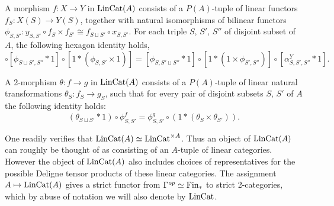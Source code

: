 \documentclass{amsart}
\begin{document}
A morphism $f:X \to Y$ in $\mathrm{LinCat}(A)$ consists of a $P(A)$-tuple of linear functors $f_S: X(S) \to Y(S)$, together with natural isomorphisms of bilinear functors $\phi_{S,S'}: y_{S,S'} \circ f_S \times f_{S'} \cong f_{S \sqcup S'} \circ x_{S,S'}$. For each triple $S$, $S'$, $S''$ of disjoint subset of $A$, the following hexagon identity holds,
\begin{equation*}
	[1 * \alpha^X_{S, S', S''}] \circ [\phi_{S \sqcup S', S''} * 1] \circ [1 *(\phi_{S, S'} \times 1)] = 
		[\phi_{S, S' \sqcup S''} * 1] \circ [1 * (1 \times \phi_{S', S''})] \circ [\alpha^Y_{S,S', S''} * 1].
\end{equation*}

A 2-morphism $\theta: f \to g$ in $\mathrm{LinCat}(A)$ consists of a $P(A)$-tuple of linear natural transformations $\theta_S: f_S \to g_S$, such that for every pair of disjoint subsets $S$, $S'$ of $A$ the following identity holds: 
\begin{equation*}
	(\theta_{S\sqcup S'}* 1) \circ \phi^f_{S,S'} = \phi^g_{S,S'} \circ (1 * (\theta_S \times \theta_{S'})).
\end{equation*}

One readily verifies that $\mathrm{LinCat}(A) \simeq \mathrm{LinCat}^{\times A}$. Thus an object of $\mathrm{LinCat}(A)$ can roughly be thought of as consisting of an $A$-tuple of linear categories. However the object of $\mathrm{LinCat}(A)$ also includes choices of representatives for the possible Deligne tensor products of these linear categories. The assignment $A \mapsto \mathrm{LinCat}(A)$ gives a strict functor from $\Gamma^{op} \simeq \mathrm{Fin}_*$ to strict 2-categories, which by abuse of notation we will also denote by $\mathrm{LinCat}$. 





\end{document}
